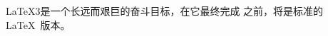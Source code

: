 \documentclass{book}
\begin{document}
\LaTeX3是一个长远而艰巨的奋斗目标，在它最终完成
之前，\LaTeXe{}将是标准的\LaTeX\ 版本。
\end{document}
